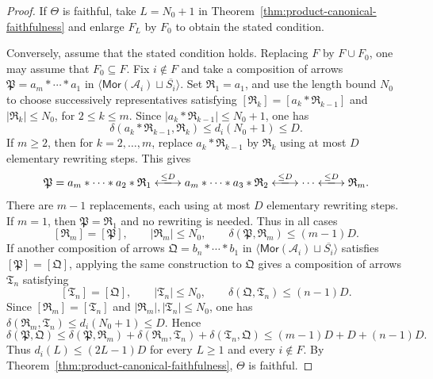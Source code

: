 \documentclass[10pt,a4paper]{amsart}
\theoremstyle{plain}
\theoremstyle{definition}
\theoremstyle{remark}
\begin{document}
\begin{proof}
  If $\Theta$ is faithful, take $L=N_0+1$ in Theorem~\ref{thm:product-canonical-faithfulness} and enlarge $F_L$ by $F_0$ to obtain the stated condition.

  \medskip

  Conversely, assume that the stated condition holds.
  Replacing $F$ by $F\cup F_0$, one may assume that $F_0\subseteq F$.
  Fix $i\notin F$ and take a composition of arrows $\mathfrak P=a_m\ast\cdots\ast a_1$ in $\langle\mathsf{Mor}(\mathcal A_i)\sqcup\overline{S_i}\rangle$.
  Set $\mathfrak R_1=a_1$, and use the length bound $N_0$ to choose successively representatives satisfying $[\mathfrak R_k]=[a_k\ast\mathfrak R_{k-1}]$ and $|\mathfrak R_k|\leq N_0$, for $2\leq k\leq m$.
  Since $|a_k\ast\mathfrak R_{k-1}|\leq N_0+1$, one has
  \[
    \delta(a_k\ast\mathfrak R_{k-1},\mathfrak R_k)
    \leq d_i(N_0+1)\leq D.
  \]
  If $m\geq2$, then for $k=2,\ldots,m$, replace $a_k\ast\mathfrak R_{k-1}$ by $\mathfrak R_k$ using at most $D$ elementary rewriting steps.
  This gives
  \[
    \mathfrak P
    =a_m\ast\cdots\ast a_2\ast\mathfrak R_1\xlongleftrightarrow{\leq D}
    a_m\ast\cdots\ast a_3\ast\mathfrak R_2\xlongleftrightarrow{\leq D}\cdots
    \xlongleftrightarrow{\leq D}
    \mathfrak R_m.
  \]
  There are $m-1$ replacements, each using at most $D$ elementary rewriting steps.
  If $m=1$, then $\mathfrak P=\mathfrak R_1$ and no rewriting is needed.
  Thus in all cases
  \[
    [\mathfrak R_m]=[\mathfrak P],
    \qquad |\mathfrak R_m|\leq N_0,
    \qquad
    \delta(\mathfrak P,\mathfrak R_m)\leq(m-1)D.
  \]
  If another composition of arrows $\mathfrak Q=b_n\ast\cdots\ast b_1$ in $\langle\mathsf{Mor}(\mathcal A_i)\sqcup\overline{S_i}\rangle$ satisfies $[\mathfrak P]=[\mathfrak Q]$, applying the same construction to $\mathfrak Q$ gives a composition of arrows $\mathfrak T_n$ satisfying
  \[
    [\mathfrak T_n]=[\mathfrak Q],
    \qquad |\mathfrak T_n|\leq N_0,
    \qquad
    \delta(\mathfrak Q,\mathfrak T_n)\leq(n-1)D.
  \]
  Since $[\mathfrak R_m]=[\mathfrak T_n]$ and $|\mathfrak R_m|,|\mathfrak T_n|\leq N_0$, one has $\delta(\mathfrak R_m,\mathfrak T_n)\leq d_i(N_0+1)\leq D$.
  Hence
  \[
    \delta(\mathfrak P,\mathfrak Q)
    \leq
    \delta(\mathfrak P,\mathfrak R_m)
    +\delta(\mathfrak R_m,\mathfrak T_n)
    +\delta(\mathfrak T_n,\mathfrak Q)\leq(m-1)D+D+(n-1)D.
  \]
  Thus $d_i(L)\leq(2L-1)D$ for every $L\geq1$ and every $i\notin F$.
  By Theorem~\ref{thm:product-canonical-faithfulness}, $\Theta$ is faithful.
\end{proof}
\end{document}
